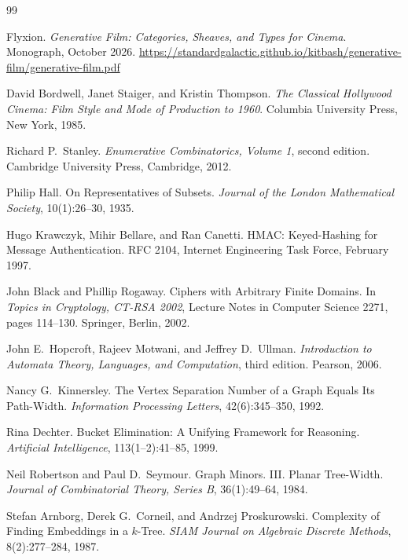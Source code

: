 \documentclass[11pt,twoside,openright]{book}
\theoremstyle{plain}
\theoremstyle{definition}
\theoremstyle{remark}
\begin{document}
\begin{thebibliography}{99}

Flyxion.
\newblock \emph{Generative Film: Categories, Sheaves, and Types for Cinema}.
\newblock Monograph, October 2026.
\newblock \url{https://standardgalactic.github.io/kitbash/generative-film/generative-film.pdf}

David Bordwell, Janet Staiger, and Kristin Thompson.
\newblock \emph{The Classical Hollywood Cinema: Film Style and Mode of Production to 1960}.
\newblock Columbia University Press, New York, 1985.

Richard P.\ Stanley.
\newblock \emph{Enumerative Combinatorics, Volume 1}, second edition.
\newblock Cambridge University Press, Cambridge, 2012.

Philip Hall.
\newblock On Representatives of Subsets.
\newblock \emph{Journal of the London Mathematical Society}, 10(1):26--30, 1935.

Hugo Krawczyk, Mihir Bellare, and Ran Canetti.
\newblock HMAC: Keyed-Hashing for Message Authentication.
\newblock RFC 2104, Internet Engineering Task Force, February 1997.

John Black and Phillip Rogaway.
\newblock Ciphers with Arbitrary Finite Domains.
\newblock In \emph{Topics in Cryptology, CT-RSA 2002}, Lecture Notes in Computer Science 2271, pages 114--130. Springer, Berlin, 2002.

John E.\ Hopcroft, Rajeev Motwani, and Jeffrey D.\ Ullman.
\newblock \emph{Introduction to Automata Theory, Languages, and Computation}, third edition.
\newblock Pearson, 2006.

Nancy G.\ Kinnersley.
\newblock The Vertex Separation Number of a Graph Equals Its Path-Width.
\newblock \emph{Information Processing Letters}, 42(6):345--350, 1992.

Rina Dechter.
\newblock Bucket Elimination: A Unifying Framework for Reasoning.
\newblock \emph{Artificial Intelligence}, 113(1--2):41--85, 1999.

Neil Robertson and Paul D.\ Seymour.
\newblock Graph Minors. III. Planar Tree-Width.
\newblock \emph{Journal of Combinatorial Theory, Series B}, 36(1):49--64, 1984.

Stefan Arnborg, Derek G.\ Corneil, and Andrzej Proskurowski.
\newblock Complexity of Finding Embeddings in a $k$-Tree.
\newblock \emph{SIAM Journal on Algebraic Discrete Methods}, 8(2):277--284, 1987.


\end{thebibliography}
\end{document}
